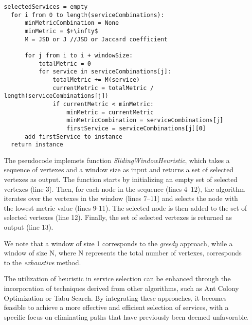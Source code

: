 \begin{lstlisting}[frame=single,mathescape, caption={Sliding Window Heuristic with Selection of First Service from Optimal Combination},label={lst:slidingwindowfirstservice}]
  selectedServices = empty
  for i from 0 to length(serviceCombinations):
      minMetricCombination = None
      minMetric = $+\infty$
      M = JSD or J //JSD or Jaccard coefficient

      for j from i to i + windowSize:
          totalMetric = 0
          for service in serviceCombinations[j]:
              totalMetric += M(service)
              currentMetric = totalMetric / length(serviceCombinations[j])
              if currentMetric < minMetric:
                  minMetric = currentMetric
                  minMetricCombination = serviceCombinations[j]
                  firstService = serviceCombinations[j][0]
      add firstService to instance
  return instance
  \end{lstlisting}

The pseudocode implemets function {\em SlidingWindowHeuristic}, which takes a sequence of vertexes and a window size as input and returns a set of selected vertexes as output. The function starts by initializing an empty set of selected vertexes (line 3). Then, for each node in the sequence (lines 4--12), the algorithm iterates over the vertexes in the window (lines 7--11) and selects the node with the lowest metric value (lines 9-11). The selected node is then added to the set of selected vertexes (line 12). Finally, the set of selected vertexes is returned as output (line 13).

We note that a window of size 1 corresponds to the \emph{greedy} approach, while a window of size N, where N represents the total number of vertexes, corresponds to the \emph{exhaustive} method.

The utilization of heuristic in service selection can be enhanced through the incorporation of techniques derived from other algorithms, such as Ant Colony Optimization or Tabu Search.
By integrating these approaches, it becomes feasible to achieve a more effective and efficient selection of services, with a specific focus on eliminating paths that have previously been deemed unfavorable.

